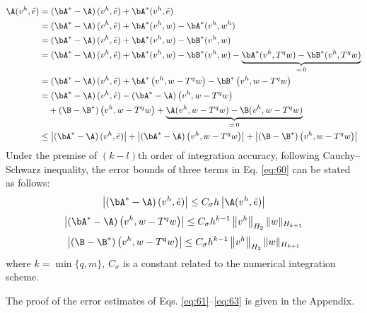 \begin{equation}\label{eq:60}
\begin{aligned}
\A(v^{h},\tilde{e})
&=\left(\bA^{*}-\A\right)(v^{h},\tilde{e})+\bA^{*}(v^{h},\tilde{e})\\
&=\left(\bA^{*}-\A\right)(v^{h},\tilde{e})+\bA^{*}(v^{h},w)-\bA^{*}(v^{h},w^{h})\\
&=\left(\bA^{*}-\A\right)(v^{h},\tilde{e})+\bA^{*}(v^{h},w)-\bB^{*}(v^{h},w)\\
&=\left(\bA^{*}-\A\right)(v^{h},\tilde{e})+\bA^{*}(v^{h},w)-\bB^{*}(v^{h},w)
-\underbrace{\bA^{*}(v^{h},T^{q}w)-\bB^{*}(v^{h},T^{q}w)}_{=\,0}\\
&=\left(\bA^{*}-\A\right)(v^{h},\tilde{e})+\bA^{*}\left(v^{h},w-T^{q}w\right)-\bB^{*}\left(v^{h},w-T^{q}w\right)\\
&=\left(\bA^{*}-\A\right)(v^{h},\tilde{e})-\left(\bA^{*}-\A\right)\left(v^{h},w-T^{q}w\right)\\
&\quad+\left(\B-\B^{*}\right)\left(v^{h},w-T^{q}w\right)
+\underbrace{\A(v^{h},w-T^{q}w)-\B(v^{h},w-T^{q}w)}_{=\,0}\\
&\le\left|\left(\bA^{*}-\A\right)(v^{h},\tilde{e})\right|
+\left|\left(\bA^{*}-\A\right)\left(v^{h},w-T^{q}w\right)\right|
+\left|\left(\B-\B^{*}\right)\left(v^{h},w-T^{q}w\right)\right|
\end{aligned}
\end{equation}
Under the premise of $(k-l)$th order of integration accuracy, following Cauchy--Schwarz inequality, the error bounds of three terms in Eq. \eqref{eq:60} can be stated as follows:
\begin{equation}\label{eq:61}
\left|\left(\bA^{*}-\A\right)(v^{h},\tilde{e})\right|\le C_{\sigma}h\left|\A(v^{h},\tilde{e})\right|
\end{equation}
\begin{equation}\label{eq:62}
\left|\left(\bA^{*}-\A\right)\left(v^{h},w-T^{q}w\right)\right|\le C_{\sigma}h^{k-1}\left\|v^{h}\right\|_{H_2}\|w\|_{H_{k+1}}
\end{equation}
\begin{equation}\label{eq:63}
\left|\left(\B-\B^{*}\right)\left(v^{h},w-T^{q}w\right)\right|\le C_{\sigma}h^{k-1}\left\|v^{h}\right\|_{H_2}\|w\|_{H_{k+1}}
\end{equation}
where $k=\min\{q,m\}$, $C_{\sigma}$ is a constant related to the numerical integration scheme.

The proof of the error estimates of Eqs. \eqref{eq:61}--\eqref{eq:63} is given in the Appendix.

